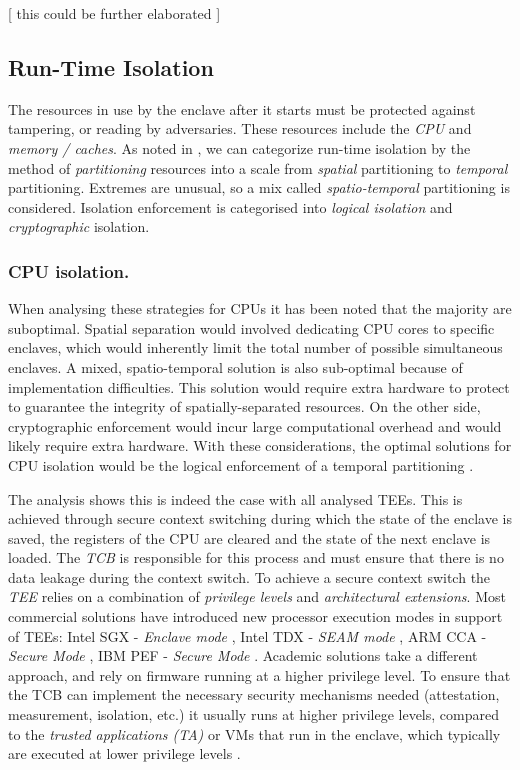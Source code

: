\documentclass[runningheads,a4paper]{uwsese}
\begin{document}
[ this could be further elaborated ]

\subsection{Run-Time Isolation}

The resources in use by the enclave after it starts must be protected against
tampering, or reading by adversaries. These resources include the \emph{CPU}
and \emph{memory / caches}. As noted in \cite{tee_hw_sup}, we can categorize run-time
isolation by the method of \emph{partitioning} resources into a scale from
\emph{spatial} partitioning to \emph{temporal} partitioning. Extremes are
unusual, so a mix called \emph{spatio-temporal} partitioning is considered.
Isolation enforcement is categorised into \emph{logical isolation} and
\emph{cryptographic} isolation.

\subsubsection{CPU isolation.}

When analysing these strategies for CPUs it has been noted that the majority
are suboptimal. Spatial separation would involved dedicating CPU cores to
specific enclaves, which would inherently limit the total number of possible
simultaneous enclaves. A mixed, spatio-temporal solution is also sub-optimal
because of implementation difficulties. This solution would require extra
hardware to protect to guarantee the integrity of spatially-separated
resources. On the other side, cryptographic enforcement would incur large
computational overhead and would likely require extra hardware. With these
considerations, the optimal solutions for CPU isolation would be the logical
enforcement of a temporal partitioning \cite{tee_hw_sup}.

The analysis shows this is indeed the case with all analysed TEEs. This is
achieved through secure context switching during which the state of the enclave
is saved, the registers of the CPU are cleared and the state of the next
enclave is loaded. The \emph{TCB} is responsible for this process and must
ensure that there is no data leakage during the context switch. To achieve a
secure context switch the \emph{TEE} relies on a combination of \emph{privilege
levels} and \emph{architectural extensions}. Most commercial solutions have
introduced new processor execution modes in support of TEEs: Intel SGX -
\emph{Enclave mode} \cite{intel_sgx}, Intel TDX - \emph{SEAM mode}
\cite{intel_tdx}, ARM CCA - \emph{Secure Mode} \cite{arm_cca}, IBM PEF -
\emph{Secure Mode} \cite{ibm_pef}. Academic solutions take a different
approach, and rely on firmware running at a higher privilege level. To ensure
that the TCB can implement the necessary security mechanisms needed
(attestation, measurement, isolation, etc.) it usually runs at higher privilege
levels, compared to the \emph{trusted applications (TA)} or VMs that run in the
enclave, which typically are executed at lower privilege levels
\cite{tee_hw_sup}. 
\end{document}
